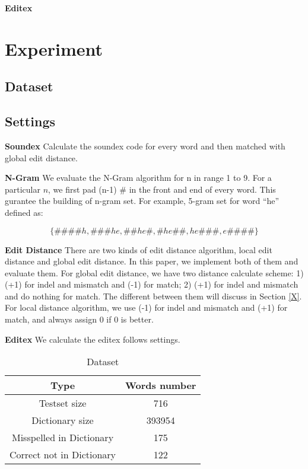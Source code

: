 \documentclass[11pt]{article}
\begin{document}
\noindent\textbf{Editex} 


\section{Experiment}

\subsection{Dataset} 

\subsection{Settings} 

\noindent\textbf{Soundex} Calculate the soundex code for every word and then matched with global edit distance.

\noindent\textbf{N-Gram} We evaluate the N-Gram algorithm for n in range 1 to 9. For a particular $n$, we first pad (n-1) \# in the front and end of every word. This gurantee the building of n-gram set. For example, 5-gram set for word ``he'' defined as: 

\begin{equation}
\{\#\#\#\#h, \#\#\#he, \#\#he\#, \#he\#\#, he\#\#\#, e\#\#\#\#\}
\end{equation}

\noindent\textbf{Edit Distance} There are two kinds of edit distance algorithm, local edit distance and global edit distance. In this paper,  we implement both of them and evaluate them. For global edit distance, we have two distance calculate scheme: 1) (+1) for indel and mismatch and (-1) for match; 2) (+1) for indel and mismatch and do nothing for match. The different between them will discuss in Section \ref{X}. For local distance algorithm, we use (-1) for indel and mismatch and (+1) for match, and always assign 0 if 0 is better.

\noindent\textbf{Editex} We calculate the editex follows \cite{} settings.

\begin{table}
	\centering
	\begin{tabular}{c|c}
		\hline
		\textbf{Type} & \textbf{Words number} \\
		\hline
		Testset size & 716 \\
		\hline
		Dictionary  size & 393954 \\
		\hline
		Misspelled in Dictionary & 175 \\
		\hline
		Correct not in Dictionary & 122 \\
		\hline
	\end{tabular}
	\caption{Dataset}
	\label{tab:dataset}
\end{table}
\end{document}
